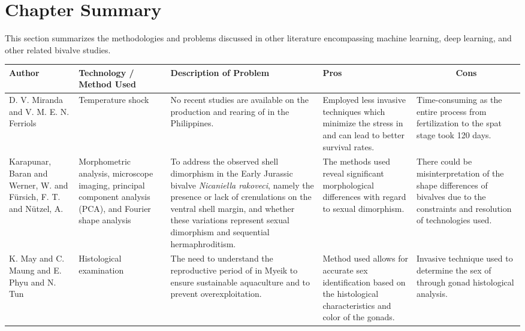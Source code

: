 {\section{Chapter Summary}
This section summarizes the methodologies and problems discussed in other literature encompassing machine learning, deep learning, and other related bivalve studies.

\begin{table}[]
	\centering
	\renewcommand{\arraystretch}{3} 
	\begin{adjustbox}{scale=0.55,center}
		\normalsize
		\begin{tabular}{|p{5cm}|p{5cm}|p{8cm}|p{8cm}|p{8cm}|}
			\hline
			\centering
			\textbf{Author} &
			\centering
			\textbf{Technology / Method Used} &
			\centering
			\textbf{Description of Problem} &
			\centering
			\textbf{Pros} &
			\multicolumn{1}{c|}{\textbf{Cons}} \\ \hline
			
			D. V. Miranda and V. M. E. N. Ferriols &
			Temperature shock &
			No recent studies are available on the production and rearing of \textit{\Tgranosa} in the Philippines. &
			Employed less invasive techniques which minimize the stress in \textit{\Tgranosa} and can lead to better survival rates. &
			Time-consuming as the entire process from fertilization to the spat stage took 120 days. \\ \hline
			
			Karapunar, Baran and Werner, W. and Fürsich, F. T. and Nützel, A. &
			Morphometric analysis, microscope imaging, principal component analysis (PCA), and Fourier shape analysis &
			To address the observed shell dimorphism in the Early Jurassic bivalve \textit{Nicaniella rakoveci}, namely the presence or lack of crenulations on the ventral shell margin, and whether these variations represent sexual dimorphism and sequential hermaphroditism. &
			The methods used reveal significant morphological differences with regard to sexual dimorphism. &
			There could be misinterpretation of the shape differences of bivalves due to the constraints and resolution of technologies used. \\ \hline
			
			K. May and C. Maung and E. Phyu and N. Tun &
			Histological examination &
			The need to understand the reproductive period of \textit{\Tgranosa} in Myeik to ensure sustainable aquaculture and to prevent overexploitation. &
			Method used allows for accurate sex identification based on the histological characteristics and color of the gonads. &
			Invasive technique used to determine the sex of \textit{\Tgranosa}through gonad histological analysis. \\ \hline
			

\end{tabular}
\end{adjustbox}
\end{table}}
